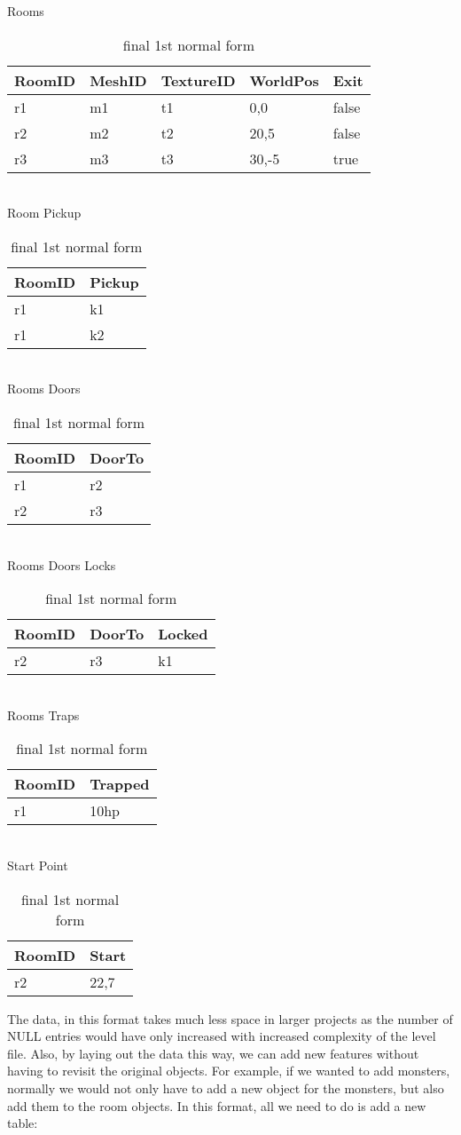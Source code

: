 \begin{table}[h]\footnotesize
Rooms \\
\begin{tabular}{lllll}
\bf{RoomID}&MeshID&TextureID&WorldPos&Exit \\
\hline
r1&m1&t1&0,0&false \\
r2&m2&t2&20,5&false \\
r3&m3&t3&30,-5&true \\
\end{tabular}\\
Room Pickup \\
\begin{tabular}{ll}
\bf{RoomID}&\bf{Pickup} \\
\hline
r1&k1 \\
r1&k2 \\
\end{tabular}\\
Rooms Doors \\
\begin{tabular}{ll}
\bf{RoomID}&DoorTo \\
\hline
r1&r2 \\
r2&r3 \\
\end{tabular}\\
Rooms Doors Locks \\
\begin{tabular}{lll}
\bf{RoomID}&DoorTo&Locked \\
\hline
r2&r3&k1 \\
\end{tabular}\\
Rooms Traps\\
\begin{tabular}{ll}
\bf{RoomID}&Trapped \\
\hline
r1&10hp \\
\end{tabular}\\
Start Point \\
\begin{tabular}{ll}
\bf{RoomID}&Start \\
\hline
r2&22,7 \\
\end{tabular}
\caption{final 1st normal form}
\end{table}

The data, in this format takes much less space in larger projects as the number
of NULL entries would have only increased with increased complexity of the
level file. Also, by laying out the data this way, we can add new features
without having to revisit the original objects. For example, if we wanted to
add monsters, normally we would not only have to add a new object for the
monsters, but also add them to the room objects. In this format, all we need to
do is add a new table:

